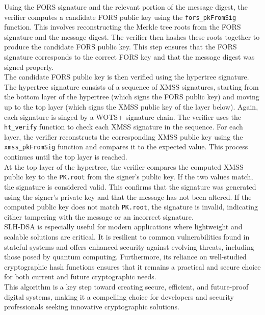 \documentclass[journal=tosc,notanonymous]{iacrtrans}
\begin{document}
Using the FORS signature and the relevant portion of the message digest, the verifier computes a candidate FORS public key using the \verb|fors_pkFromSig| function. This involves reconstructing the Merkle tree roots from the FORS signature and the message digest. The verifier then hashes these roots together to produce the candidate FORS public key. This step ensures that the FORS signature corresponds to the correct FORS key and that the message digest was signed properly.\\
The candidate FORS public key is then verified using the hypertree signature. The hypertree signature consists of a sequence of XMSS signatures, starting from the bottom layer of the hypertree (which signs the FORS public key) and moving up to the top layer (which signs the XMSS public key of the layer below). Again, each signature is singed by a WOTS+ signature chain. The verifier uses the \verb|ht_verify| function to check each XMSS signature in the sequence. For each layer, the verifier reconstructs the corresponding XMSS public key using the \verb|xmss_pkFromSig| function and compares it to the expected value. This process continues until the top layer is reached.\\
At the top layer of the hypertree, the verifier compares the computed XMSS public key to the \texttt{PK.root} from the signer's public key. If the two values match, the signature is considered valid. This confirms that the signature was generated using the signer's private key and that the message has not been altered. If the computed public key does not match \texttt{PK.root}, the signature is invalid, indicating either tampering with the message or an incorrect signature. \cite{national-institute-of-standards-and-technology-2024}\\
\newline
SLH-DSA is especially useful for modern applications where lightweight and scalable solutions are critical. It is resilient to common vulnerabilities found in stateful systems and offers enhanced security against evolving threats, including those posed by quantum computing. Furthermore, its reliance on well-studied cryptographic hash functions ensures that it remains a practical and secure choice for both current and future cryptographic needs.
\\
This algorithm is a key step toward creating secure, efficient, and future-proof digital systems, making it a compelling choice for developers and security professionals seeking innovative cryptographic solutions.
\end{document}

